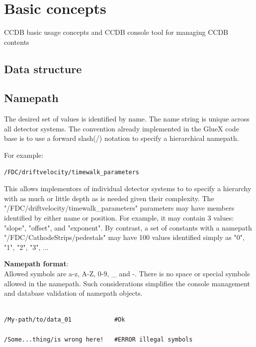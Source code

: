 \documentclass{article}
\begin{document}
\newpage
\section{Basic concepts}\label{sec:basic_concepts}

CCDB basic usage concepts and CCDB console tool for managing CCDB contents


\subsection{Data structure}


\subsection{Namepath}
The desired set of values is identified by name. The name string is unique
across all detector systems. The convention already implemented in the GlueX
code base is to use a forward slash(/) notation to specify a hierarchical
namepath.

For example:
\begin{verbatim}
/FDC/driftvelocity/timewalk_parameters
\end{verbatim}

This allows implementors of individual detector systems to to specify a
hierarchy with as much or little depth as is needed given their complexity.
The "/FDC/driftvelocity/timewalk\_parameters" parameters may have members
identified by either name or position. For example, it may contain 3 values:
"slope", "offset", and "exponent". By contrast, a set of constants with a
namepath "/FDC/CathodeStrips/pedestals" may have 100 values identified simply
as "0", "1", "2", "3", ...

\textbf{Namepath format}:\\
Allowed symbols are a-z, A-Z, 0-9, \_ and -. There is no space or special symbols
allowed in the namepath. Such considerations simplifies the console management
and database validation of namepath objects.
\begin{verbatim}

/My-path/to/data_01            #Ok

/Some...thing/is wrong here!   #ERROR illegal symbols

\end{verbatim}
\end{document}
